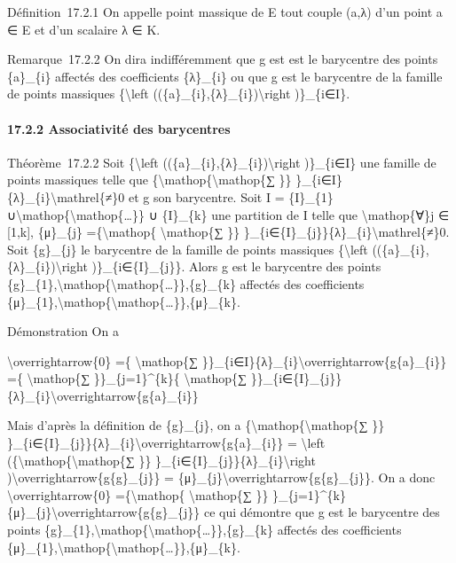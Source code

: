 \documentclass[]{article}
\begin{document}
Définition~17.2.1 On appelle point massique de E tout couple (a,λ) d'un
point a ∈ E et d'un scalaire λ ∈ K.

Remarque~17.2.2 On dira indifféremment que g est est le barycentre des
points \{a\}\_\{i\} affectés des coefficients \{λ\}\_\{i\} ou que g est
le barycentre de la famille de points massiques \{\textbackslash{}left
((\{a\}\_\{i\},\{λ\}\_\{i\})\textbackslash{}right )\}\_\{i∈I\}.

\paragraph{17.2.2 Associativité des barycentres}

Théorème~17.2.2 Soit \{\textbackslash{}left
((\{a\}\_\{i\},\{λ\}\_\{i\})\textbackslash{}right )\}\_\{i∈I\} une
famille de points massiques telle que
\{\textbackslash{}mathop\{\textbackslash{}mathop\{∑ \}\}
\}\_\{i∈I\}\{λ\}\_\{i\}\textbackslash{}mathrel\{≠\}0 et g son
barycentre. Soit I = \{I\}\_\{1\}
∪\textbackslash{}mathop\{\textbackslash{}mathop\{\ldots{}\}\} ∪
\{I\}\_\{k\} une partition de I telle que \textbackslash{}mathop\{∀\}j ∈
{[}1,k{]}, \{μ\}\_\{j\} =\{\textbackslash{}mathop\{
\textbackslash{}mathop\{∑ \}\}
\}\_\{i∈\{I\}\_\{j\}\}\{λ\}\_\{i\}\textbackslash{}mathrel\{≠\}0. Soit
\{g\}\_\{j\} le barycentre de la famille de points massiques
\{\textbackslash{}left ((\{a\}\_\{i\},\{λ\}\_\{i\})\textbackslash{}right
)\}\_\{i∈\{I\}\_\{j\}\}. Alors g est le barycentre des points
\{g\}\_\{1\},\textbackslash{}mathop\{\textbackslash{}mathop\{\ldots{}\}\},\{g\}\_\{k\}
affectés des coefficients
\{μ\}\_\{1\},\textbackslash{}mathop\{\textbackslash{}mathop\{\ldots{}\}\},\{μ\}\_\{k\}.

Démonstration On a

\textbackslash{}overrightarrow\{0\} =\{ \textbackslash{}mathop\{∑
\}\}\_\{i∈I\}\{λ\}\_\{i\}\textbackslash{}overrightarrow\{g\{a\}\_\{i\}\}
=\{ \textbackslash{}mathop\{∑ \}\}\_\{j=1\}\^{}\{k\}\{
\textbackslash{}mathop\{∑
\}\}\_\{i∈\{I\}\_\{j\}\}\{λ\}\_\{i\}\textbackslash{}overrightarrow\{g\{a\}\_\{i\}\}

Mais d'après la définition de \{g\}\_\{j\}, on a
\{\textbackslash{}mathop\{\textbackslash{}mathop\{∑ \}\}
\}\_\{i∈\{I\}\_\{j\}\}\{λ\}\_\{i\}\textbackslash{}overrightarrow\{g\{a\}\_\{i\}\}
= \textbackslash{}left
(\{\textbackslash{}mathop\{\textbackslash{}mathop\{∑ \}\}
\}\_\{i∈\{I\}\_\{j\}\}\{λ\}\_\{i\}\textbackslash{}right
)\textbackslash{}overrightarrow\{g\{g\}\_\{j\}\} =
\{μ\}\_\{j\}\textbackslash{}overrightarrow\{g\{g\}\_\{j\}\}. On a donc
\textbackslash{}overrightarrow\{0\} =\{\textbackslash{}mathop\{
\textbackslash{}mathop\{∑ \}\}
\}\_\{j=1\}\^{}\{k\}\{μ\}\_\{j\}\textbackslash{}overrightarrow\{g\{g\}\_\{j\}\}
ce qui démontre que g est le barycentre des points
\{g\}\_\{1\},\textbackslash{}mathop\{\textbackslash{}mathop\{\ldots{}\}\},\{g\}\_\{k\}
affectés des coefficients
\{μ\}\_\{1\},\textbackslash{}mathop\{\textbackslash{}mathop\{\ldots{}\}\},\{μ\}\_\{k\}.
\end{document}
